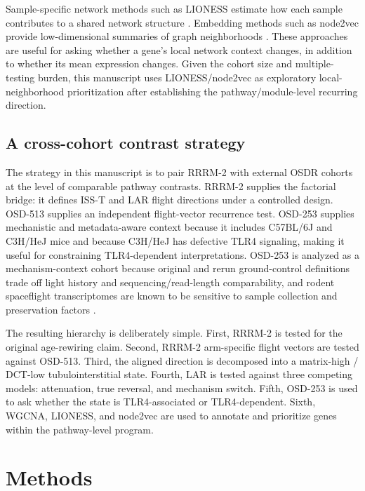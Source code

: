 \documentclass[11pt]{article}
\begin{document}
Sample-specific network methods such as LIONESS estimate how each sample contributes to a shared network structure \citep{kuijjer2019estimating}. Embedding methods such as node2vec provide low-dimensional summaries of graph neighborhoods \citep{grover2016node2vec}. These approaches are useful for asking whether a gene's local network context changes, in addition to whether its mean expression changes. Given the cohort size and multiple-testing burden, this manuscript uses LIONESS/node2vec as exploratory local-neighborhood prioritization after establishing the pathway/module-level recurring direction.

\subsection{A cross-cohort contrast strategy}

The strategy in this manuscript is to pair RRRM-2 with external OSDR cohorts at the level of comparable pathway contrasts. RRRM-2 supplies the factorial bridge: it defines ISS-T and LAR flight directions under a controlled design. OSD-513 supplies an independent flight-vector recurrence test. OSD-253 supplies mechanistic and metadata-aware context because it includes C57BL/6J and C3H/HeJ mice and because C3H/HeJ has defective TLR4 signaling, making it useful for constraining TLR4-dependent interpretations. OSD-253 is analyzed as a mechanism-context cohort because original and rerun ground-control definitions trade off light history and sequencing/read-length comparability, and rodent spaceflight transcriptomes are known to be sensitive to sample collection and preservation factors \citep{galazka2020rnaseq,preserve2016}.

The resulting hierarchy is deliberately simple. First, RRRM-2 is tested for the original age-rewiring claim. Second, RRRM-2 arm-specific flight vectors are tested against OSD-513. Third, the aligned direction is decomposed into a matrix-high / DCT-low tubulointerstitial state. Fourth, LAR is tested against three competing models: attenuation, true reversal, and mechanism switch. Fifth, OSD-253 is used to ask whether the state is TLR4-associated or TLR4-dependent. Sixth, WGCNA, LIONESS, and node2vec are used to annotate and prioritize genes within the pathway-level program.

\section{Methods}
\end{document}
